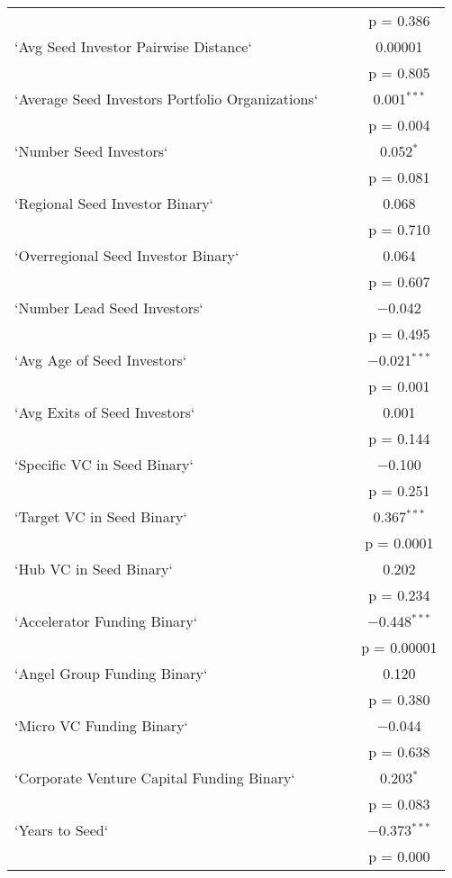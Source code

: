 \begin{table}[!htbp]
\begin{tabular}{@{\extracolsep{0pt}}lccc}
  &  &  & p = 0.386 \\ 
  `Avg Seed Investor Pairwise Distance` &  &  & 0.00001 \\ 
  &  &  & p = 0.805 \\ 
  `Average Seed Investors Portfolio Organizations` &  &  & 0.001$^{***}$ \\ 
  &  &  & p = 0.004 \\ 
  `Number Seed Investors` &  &  & 0.052$^{*}$ \\ 
  &  &  & p = 0.081 \\ 
  `Regional Seed Investor Binary` &  &  & 0.068 \\ 
  &  &  & p = 0.710 \\ 
  `Overregional Seed Investor Binary` &  &  & 0.064 \\ 
  &  &  & p = 0.607 \\ 
  `Number Lead Seed Investors` &  &  & $-$0.042 \\ 
  &  &  & p = 0.495 \\ 
  `Avg Age of Seed Investors` &  &  & $-$0.021$^{***}$ \\ 
  &  &  & p = 0.001 \\ 
  `Avg Exits of Seed Investors` &  &  & 0.001 \\ 
  &  &  & p = 0.144 \\ 
  `Specific VC in Seed Binary` &  &  & $-$0.100 \\ 
  &  &  & p = 0.251 \\ 
  `Target VC in Seed Binary` &  &  & 0.367$^{***}$ \\ 
  &  &  & p = 0.0001 \\ 
  `Hub VC in Seed Binary` &  &  & 0.202 \\ 
  &  &  & p = 0.234 \\ 
  `Accelerator Funding Binary` &  &  & $-$0.448$^{***}$ \\ 
  &  &  & p = 0.00001 \\ 
  `Angel Group Funding Binary` &  &  & 0.120 \\ 
  &  &  & p = 0.380 \\ 
  `Micro VC Funding Binary` &  &  & $-$0.044 \\ 
  &  &  & p = 0.638 \\ 
  `Corporate Venture Capital Funding Binary` &  &  & 0.203$^{*}$ \\ 
  &  &  & p = 0.083 \\ 
  `Years to Seed` &  &  & $-$0.373$^{***}$ \\ 
  &  &  & p = 0.000 \\ 

\end{tabular}
\end{table}

